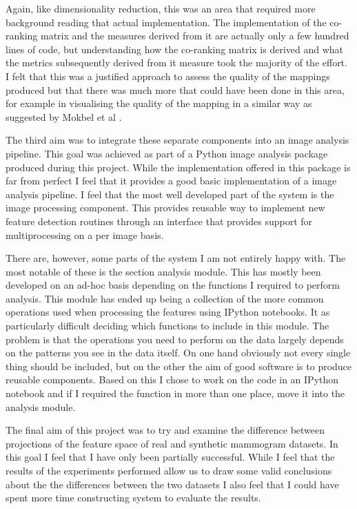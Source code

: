 Again, like dimensionality reduction, this was an area that required more background reading that actual implementation. The implementation of the co-ranking matrix and the measures derived from it are actually only a few hundred lines of code, but understanding how the co-ranking matrix is derived and what the metrics subsequently derived from it measure took the majority of the effort. I felt that this was a justified approach to assess the quality of the mappings produced but that there was much more that could have been done in this area, for example in visualising the quality of the mapping in a similar way as suggested by Mokbel et al \cite{mokbel2013visualizing}.

The third aim was to integrate these separate components into an image analysis pipeline. This goal was achieved as part of a Python image analysis package produced during this project. While the implementation offered in this package is far from perfect I feel that it provides a good basic implementation of a image analysis pipeline. I feel that the most well developed part of the system is the image processing component. This provides reusable way to implement new feature detection routines through an interface that provides support for multiprocessing on a per image basis.

There are, however, some parts of the system I am not entirely happy with. The most notable of these is the section analysis module. This has mostly been developed on an ad-hoc basis depending on the functions I required to perform analysis. This module has ended up being a collection of the more common operations used when processing the features using IPython notebooks. It as particularly difficult deciding which functions to include in this module. The problem is that the operations you need to perform on the data largely depends on the patterns you see in the data itself. On one hand obviously not every single thing should be included, but on the other the aim of good software is to produce reusable components. Based on this I chose to work on the code in an IPython notebook and if I required the function in more than one place, move it into the analysis module.

The final aim of this project was to try and examine the difference between projections of the feature space of real and synthetic mammogram datasets. In this goal I feel that I have only been partially successful. While I feel that the results of the experiments performed allow us to draw some valid conclusions about the the differences between the two datasets I also feel that I could have spent more time constructing system to evaluate the results.

